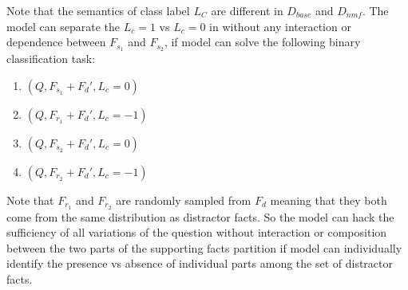 Note that the semantics of class label $L_C$ are different in $D_{base}$ and $D_{nmf}$. The model can separate the $L_c=1$ vs $L_c=0$ in without any interaction or dependence between $F_{s_1}$ and $F_{s_2}$, if model can solve the following binary classification task:

\begin{enumerate}[noitemsep]
    \item $(Q, F_{s_1} + F_d', L_c=0)$
    \item $(Q, F_{r_1} + F_d', L_c=-1)$
    \item $(Q, F_{s_2} + F_d', L_c=0)$
    \item $(Q, F_{r_2} + F_d', L_c=-1)$
\end{enumerate}

Note that $F_{r_1}$ and $F_{r_2}$ are randomly sampled from $F_d$ meaning that they both come from the same distribution as distractor facts. So the model can hack the sufficiency of all variations of the question without interaction or composition between the two parts of the supporting facts partition if model can individually identify the presence vs absence of individual parts among the set of distractor facts.

\eat{
    
}
